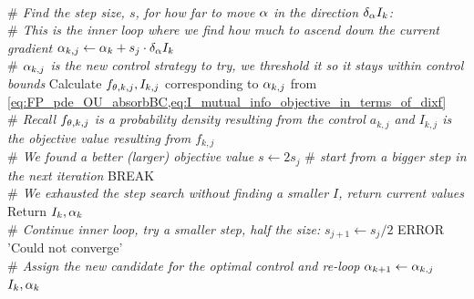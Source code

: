\begin{algorithm}                     
\begin{algorithmic} [1]              
	\\ {\itshape $\#$ Find the step size, $s$, for how far to move $\alpha$ in the
	direction $\delta_\alpha I_k$:}
	\\ {\itshape $\#$ This is the inner loop where we find how much to ascend down
	the current gradient}
	\State $\alpha_{k,j} \gets \alpha_{k} + s_j \cdot \delta_\alpha I_k  $
	\\ {\itshape $\#$ $\alpha_{k,j}$ is the new control strategy to try, we threshold
	it so it stays within control bounds}
	 \State Calculate $f_{{ \theta},k,j}, I_{k,j}$
	corresponding to $\alpha_{k,j}$ from
		\cref{eq:FP_pde_OU_absorbBC,eq:I_mutual_info_objective_in_terms_of_dixf}
		\\ {\itshape $\#$ Recall $f_{{ \theta},k,j}$ is a probability density resulting from
		the control $a_{k,j}$ and $I_{k,j}$ is the objective value resulting from $f_{k,j}$}
		\\ {\itshape $\#$ We found a better (larger) objective value}
		\State $s \gets 2 s_j$ {\itshape $\#$ start from a bigger step in the
		next iteration}
		\State BREAK
		\EndIf
		\\ {\itshape $\#$ We exhausted the step search without finding a 
		smaller $I$, return current values}
		\State Return $I_k, \alpha_k$
	\EndIf
 	\\ {\itshape  $ \#$ Continue inner loop, try a smaller step, half the size:}
	 	\State $s_{j+1}  \gets  s_j / 2$
		\State ERROR 'Could not converge'
	\EndIf
    \\{\itshape $\#$ Assign the new candidate for the optimal control and
    re-loop}
		\State $\alpha_{k+1} \gets \alpha_{k,j}$
\State \Return $I_k, \alpha_k$
\end{algorithmic}
\end{algorithm}

\clearpage

